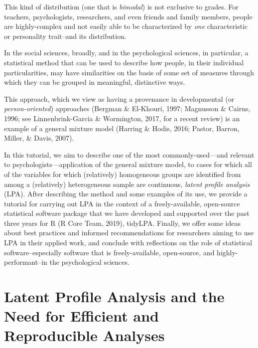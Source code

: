 \documentclass[english,man]{apa6}
\begin{document}
This kind of distribution (one that is \emph{bimodal}) is not exclusive to grades.
For teachers, psychologists, researchers, and even friends and family members,
people are highly-complex and not easily able to be characterized by \emph{one}
characteristic or personality trait--and its distribution.

In the social sciences, broadly, and in the psychological sciences, in
particular, a statistical method that can be used to describe how people, in
their individual particularities, may have similarities on the basis of some set
of measures through which they can be grouped in meaningful, distinctive ways.

This approach, which we view as having a provenance in developmental (or
\emph{person-oriented}) approaches (Bergman \& El-Khouri, 1997; Magnusson \&
Cairns, 1996; see Linnenbrink-Garcia \& Wormington, 2017, for a recent review) is
an example of a general mixture model (Harring \& Hodis, 2016; Pastor, Barron,
Miller, \& Davis, 2007).

In this tutorial, we aim to describe one of the most commonly-used---and
relevant to psychologists---application of the general mixture model, to cases
for which all of the variables for which (relatively) homogeneous groups are
identified from among a (relatively) heterogeneous sample are continuous, \emph{latent
profile analysis} (LPA). After describing the method and some examples of its
use, we provide a tutorial for carrying out LPA in the context of a
freely-available, open-source statistical software package that we have
developed and supported over the past three years for R (R Core Team, 2019),
tidyLPA. Finally, we offer some ideas about best practices and informed
recommendations for researchers aiming to use LPA in their applied work, and
conclude with reflections on the role of statistical software--especially
software that is freely-available, open-source, and highly-performant--in the
psychological sciences.

\hypertarget{latent-profile-analysis-and-the-need-for-efficient-and-reproducible-analyses}{%
\section{Latent Profile Analysis and the Need for Efficient and Reproducible Analyses}\label{latent-profile-analysis-and-the-need-for-efficient-and-reproducible-analyses}}
\end{document}
